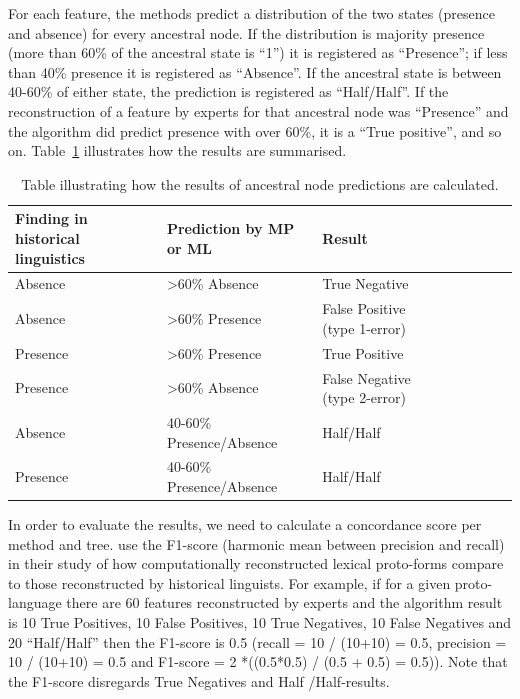 \documentclass[draft,10pt]{article} %
\begin{document}
For each feature, the methods predict a distribution of the two states (presence and absence) for every ancestral node. If the distribution is majority presence (more than 60\% of the ancestral state is ``1'') it is registered as ``Presence''; if less than 40\% presence it is registered as ``Absence''. If the ancestral state is between 40-60\% of either state, the prediction is registered as ``Half/Half''. If the reconstruction of a feature by experts for that ancestral node was ``Presence'' and the algorithm did predict presence with over 60\%, it is a ``True positive'', and so on. Table~\ref{example_HL_prediction_table_true_positives} illustrates how the results are summarised.

\begin{table}[H]
\centering
\caption{Table illustrating how the results of ancestral node predictions are calculated.}
\label{example_HL_prediction_table_true_positives}
\begin{tabular}{|l|l|l|l|l|l|l|l|}
\hline
\textbf{Finding in historical linguistics} & \textbf{Prediction by MP or ML} & \textbf{Result} \\ \hline
Absence & >60\% Absence & True Negative \\ \hline
Absence & >60\% Presence & False Positive (type 1-error) \\ \hline
Presence & >60\% Presence & True Positive \\ \hline
Presence & >60\% Absence & False Negative (type 2-error) \\ \hline
Absence & 40-60\% Presence/Absence & Half/Half \\ \hline
Presence & 40-60\% Presence/Absence & Half/Half\\ \hline
\end{tabular}
\end{table}

In order to evaluate the results, we need to calculate a concordance score per method and tree. \citet{jager2018using} use the F1-score (harmonic mean between precision and recall) in their study of how computationally reconstructed lexical proto-forms compare to those reconstructed by historical linguists.  For example, if for a given proto-language there are 60 features reconstructed by experts and the algorithm result is 10 True Positives, 10 False Positives, 10 True Negatives, 10 False Negatives and 20 ``Half/Half'' then the F1-score is 0.5 (recall = 10 / (10+10) = 0.5, precision = 10 / (10+10) = 0.5 and F1-score = 2 *((0.5*0.5) / (0.5 + 0.5) = 0.5)). Note that the F1-score disregards True Negatives and Half /Half-results.
\end{document}
